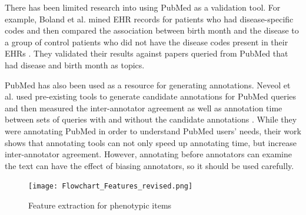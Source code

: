 \documentclass{sig-alternate-05-2015}
\begin{document}
There has been limited research into using PubMed as a validation tool.
For example, Boland et al. mined EHR records for patients who had disease-specific codes and then compared the association between birth month and the disease to a group of control patients who did not have the disease codes present in their EHRs \cite{boland2015birth}. 
They validated their results against papers queried from PubMed that had disease and birth month as topics.

PubMed has also been used as a resource for generating annotations.
Neveol  et al. used pre-existing tools to generate candidate annotations for PubMed queries and then measured the inter-annotator agreement as well as annotation time between sets of queries with and without the candidate annotations \cite{neveol2011semi}. 
While they were annotating PubMed in order to understand PubMed users' needs, their work shows that annotating tools can not only speed up annotating time, but increase inter-annotator agreement.
However, annotating before annotators can examine the text can have the effect of biasing annotators, so it should be used carefully.


\begin{figure} [t]
\centering
\texttt{[image: Flowchart\_Features\_revised.png]}
\caption{Feature extraction for phenotypic items}
\label{fig:feature-extract}
\end{figure}
\end{document}
